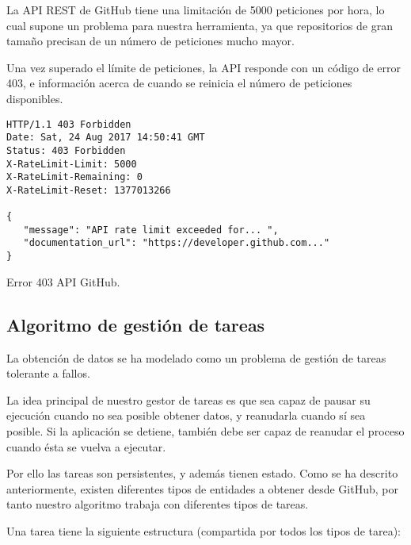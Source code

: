 La API REST de GitHub tiene una limitación de 5000 peticiones por hora, lo cual supone un problema para nuestra herramienta, ya que repositorios de gran tamaño precisan de un número de peticiones mucho mayor.

Una vez superado el límite de peticiones, la API responde con un código de error 403, e información acerca de cuando se reinicia el número de peticiones disponibles.

\begin{listing}
\begin{verbatim}
HTTP/1.1 403 Forbidden
Date: Sat, 24 Aug 2017 14:50:41 GMT
Status: 403 Forbidden
X-RateLimit-Limit: 5000
X-RateLimit-Remaining: 0
X-RateLimit-Reset: 1377013266

{
   "message": "API rate limit exceeded for... ",
   "documentation_url": "https://developer.github.com..."
}
\end{verbatim}
\caption{Error 403 API GitHub.} 
\label{error-403}
\end{listing}

\subsection{Algoritmo de gestión de tareas}

La obtención de datos se ha modelado como un problema de gestión de tareas tolerante a fallos.

La idea principal de nuestro gestor de tareas es que sea capaz de pausar su ejecución cuando no sea posible obtener datos, y reanudarla cuando sí sea posible. Si la aplicación se detiene, también debe ser capaz de reanudar el proceso cuando ésta se vuelva a ejecutar.

Por ello las tareas son persistentes, y además tienen estado. Como se ha descrito anteriormente, existen diferentes tipos de entidades a obtener desde GitHub, por tanto nuestro algoritmo trabaja con diferentes tipos de tareas.

Una tarea tiene la siguiente estructura (compartida por todos los tipos de tarea):

